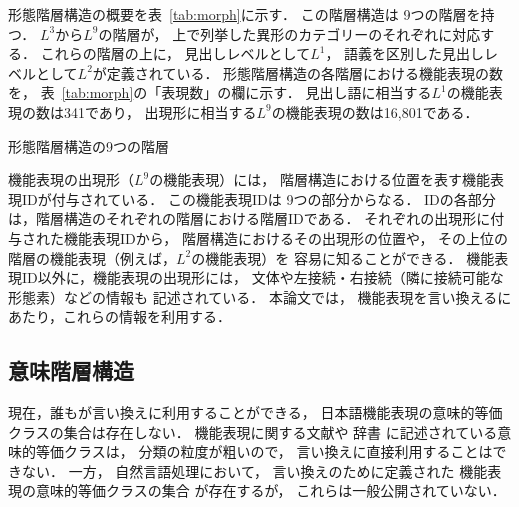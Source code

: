 \documentclass[japanese]{jnlp_1.4}
\begin{document}
形態階層構造の概要を表~\ref{tab:morph}に示す．
この階層構造は 9つの階層を持つ．
$L^3$から$L^9$の階層が，
上で列挙した異形のカテゴリーのそれぞれに対応する．
これらの階層の上に，
見出しレベルとして$L^1$，
語義を区別した見出しレベルとして$L^2$が定義されている．
形態階層構造の各階層における機能表現の数を，
表~\ref{tab:morph}の「表現数」の欄に示す．
見出し語に相当する$L^1$の機能表現の数は341であり，
出現形に相当する$L^9$の機能表現の数は16,801である．

\begin{table}[t]
\caption{形態階層構造の9つの階層}
\label{tab:morph}

\end{table}


機能表現の出現形（$L^9$の機能表現）には，
階層構造における位置を表す機能表現IDが付与されている．
この機能表現IDは 9つの部分からなる．
IDの各部分は，階層構造のそれぞれの階層における階層IDである．
それぞれの出現形に付与された機能表現IDから，
階層構造におけるその出現形の位置や，
その上位の階層の機能表現（例えば，$L^2$の機能表現）を
容易に知ることができる．
機能表現ID以外に，機能表現の出現形には，
文体や左接続・右接続（隣に接続可能な形態素）などの情報も
記述されている．
本論文では，
機能表現を言い換えるにあたり，これらの情報を利用する．



\subsection{意味階層構造}
\label{subsec:semantic}

現在，誰もが言い換えに利用することができる，
日本語機能表現の意味的等価クラスの集合は存在しない．
機能表現に関する文献や
辞書
に記述されている意味的等価クラスは，
分類の粒度が粗いので，
言い換えに直接利用することはできない．
一方，
自然言語処理において，
言い換えのために定義された
機能表現の意味的等価クラスの集合
が存在するが，
これらは一般公開されていない．
\end{document}
